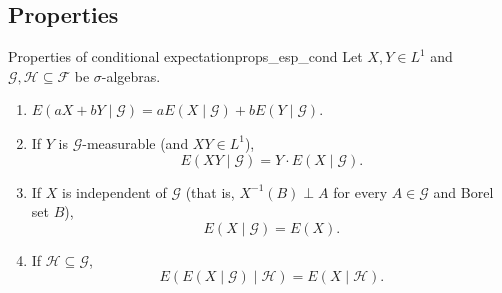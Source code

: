\documentclass[11pt, a4paper]{article}
\begin{document}
\subsection{Properties}

\begin{proposicion}{Properties of conditional expectation}{props_esp_cond}
Let $X, Y \in L^1$ and $\mathcal{G}, \mathcal{H} \subseteq \mathcal{F}$ be $\sigma$-algebras.
\begin{enumerate}
    \item $E(aX + bY \mid \mathcal{G}) = a E(X \mid \mathcal{G}) + b E(Y \mid \mathcal{G})$.
    \item If $Y$ is $\mathcal{G}$-measurable (and $XY \in L^1$),
    $$ E(XY \mid \mathcal{G}) = Y \cdot E(X \mid \mathcal{G}). $$
    \item If $X$ is independent of $\mathcal{G}$ (that is, $X^{-1}(B) \perp A$ for every $A \in
    \mathcal{G}$ and Borel set $B$),
    $$ E(X \mid \mathcal{G}) = E(X). $$
    \item If $\mathcal{H} \subseteq \mathcal{G}$,
    $$ E(E(X \mid \mathcal{G}) \mid \mathcal{H}) = E(X \mid \mathcal{H}). $$
\end{enumerate}
\end{proposicion}
\end{document}
